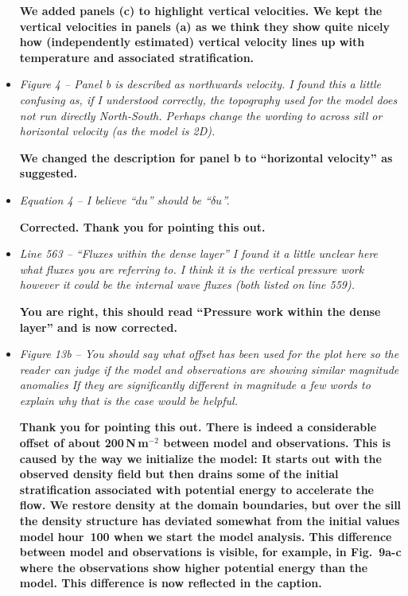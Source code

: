\documentclass[11pt]{article}
\begin{document}
\begin{flushleft}
\begin{itemize}
\textbf{We added panels (c) to highlight vertical velocities. We kept the vertical velocities in panels (a) as we think they show quite nicely how (independently estimated) vertical velocity lines up with temperature and associated stratification.}

\item \textit{Figure 4 -- Panel b is described as northwards velocity. I found this a little confusing as, if I understood correctly, the topography used for the model does not run directly North-South. Perhaps change the wording to across sill or horizontal velocity (as the model is 2D).}

\textbf{We changed the description for panel b to ``horizontal velocity'' as suggested.}

\item \textit{Equation 4 -- I believe ``$du$'' should be ``$\delta u$''.}

\textbf{Corrected. Thank you for pointing this out.}

\item \textit{Line 563 -- ``Fluxes within the dense layer'' I found it a little unclear here what fluxes you are referring to. I think it is the vertical pressure work however it could be the internal wave fluxes (both listed on line 559).}

\textbf{You are right, this should read ``Pressure work within the dense layer'' and is now corrected.}

\item \textit{Figure 13b -- You should say what offset has been used for the plot here so the reader can judge if the model and observations are showing similar magnitude anomalies If they are significantly different in magnitude a few words to explain why that is the case would be helpful.}

\textbf{Thank you for pointing this out. There is indeed a considerable offset of about 200\,N\,m$^{-2}$ between model and observations. This is caused by the way we initialize the model: It starts out with the observed density field but then drains some of the initial stratification associated with potential energy to accelerate the flow. We restore density at the domain boundaries, but over the sill the density structure has deviated somewhat from the initial values model hour~100 when we start the model analysis. This difference between model and observations is visible, for example, in Fig.~9a-c where the observations show higher potential energy than the model. This difference is now reflected in the caption.}


\end{itemize}
\end{flushleft}
\end{document}
